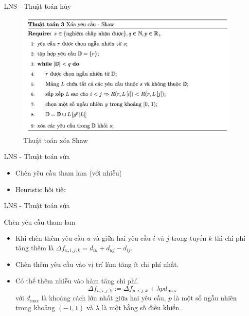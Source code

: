 \begin{frame}{LNS - Thuật toán hủy}
  \begin{figure}[H] %
    \centering %
    \includegraphics[width=1\textwidth]{figures/des_shaw.png} 
    \caption{Thuật toán xóa Shaw} 
    \label{fig:shaw_pseudo}
  \end{figure} 
\end{frame}

\begin{frame}{LNS - Thuật toán sửa}
  \begin{itemize}
    \item Chèn yêu cầu tham lam (với nhiễu)
    \item Heuristic hối tiếc
  \end{itemize}  
\end{frame}

\begin{frame}{LNS - Thuật toán sửa}
  \begin{block}{Chèn yêu cầu tham lam}
    \begin{itemize}
      \item Khi chèn thêm yêu cầu $u$ và giữa hai yêu cầu $i$ và $j$ trong tuyến $k$ thì chi phí tăng thêm là $\Delta f_{u, i, j, k} = d_{iu} + d_{uj} - d_{ij}$.
      \item Chèn thêm yêu cầu vào vị trí làm tăng ít chi phí nhất.
      \item Có thể thêm nhiễu vào hàm tăng chi phí.
      \begin{equation}
        \Delta f_{u, i, j, k} := \Delta f_{u, i, j, k} + \lambda p d_{\text{max}}
      \end{equation}
      với $d_{\text{max}}$ là khoảng cách lớn nhất giữa hai yêu cầu, $p$ là một số ngẫu nhiên trong khoảng $(-1,1)$ và $\lambda$ là một hằng số điều khiển.
    \end{itemize}
  \end{block}
\end{frame}


